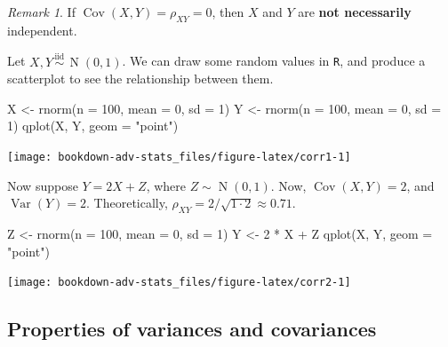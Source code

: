\documentclass[
]{book}
\newenvironment{Shaded}{\begin{snugshade}}{\end{snugshade}}
\newcommand{\AttributeTok}[1]{\textcolor[rgb]{0.77,0.63,0.00}{#1}}
\newcommand{\DecValTok}[1]{\textcolor[rgb]{0.00,0.00,0.81}{#1}}
\newcommand{\FunctionTok}[1]{\textcolor[rgb]{0.00,0.00,0.00}{#1}}
\newcommand{\NormalTok}[1]{#1}
\newcommand{\OtherTok}[1]{\textcolor[rgb]{0.56,0.35,0.01}{#1}}
\newcommand{\SpecialCharTok}[1]{\textcolor[rgb]{0.00,0.00,0.00}{#1}}
\newcommand{\StringTok}[1]{\textcolor[rgb]{0.31,0.60,0.02}{#1}}
\DeclareMathOperator{\Var}{Var}
\DeclareMathOperator{\Cov}{Cov}
\DeclareMathOperator{\N}{N}
\newcommand{\iid}{\,\overset{\text{iid}}{\sim}\,}
\theoremstyle{definition}
\theoremstyle{definition}
\theoremstyle{definition}
\theoremstyle{definition}
\theoremstyle{remark}
\newtheorem*{remark}{Remark}
\begin{document}
\begin{remark}
If \(\Cov(X,Y)=\rho_{XY}=0\), then \(X\) and \(Y\) are \textbf{not necessarily} independent.
\end{remark}

Let \(X,Y\iid\N(0,1)\).
We can draw some random values in \texttt{R}, and produce a scatterplot to see the relationship between them.

\begin{Shaded}
\begin{Highlighting}[]
\NormalTok{X }\OtherTok{\textless{}{-}} \FunctionTok{rnorm}\NormalTok{(}\AttributeTok{n =} \DecValTok{100}\NormalTok{, }\AttributeTok{mean =} \DecValTok{0}\NormalTok{, }\AttributeTok{sd =} \DecValTok{1}\NormalTok{)}
\NormalTok{Y }\OtherTok{\textless{}{-}} \FunctionTok{rnorm}\NormalTok{(}\AttributeTok{n =} \DecValTok{100}\NormalTok{, }\AttributeTok{mean =} \DecValTok{0}\NormalTok{, }\AttributeTok{sd =} \DecValTok{1}\NormalTok{)}
\FunctionTok{qplot}\NormalTok{(X, Y, }\AttributeTok{geom =} \StringTok{"point"}\NormalTok{)}
\end{Highlighting}
\end{Shaded}

\begin{center}\texttt{[image: bookdown-adv-stats\_files/figure-latex/corr1-1]} \end{center}

Now suppose \(Y=2X + Z\), where \(Z\sim\N(0,1)\).
Now, \(\Cov(X,Y)= 2\), and \(\Var(Y)=2\).
Theoretically, \(\rho_{XY}=2/\sqrt{1\cdot 2}\approx 0.71\).

\begin{Shaded}
\begin{Highlighting}[]
\NormalTok{Z }\OtherTok{\textless{}{-}} \FunctionTok{rnorm}\NormalTok{(}\AttributeTok{n =} \DecValTok{100}\NormalTok{, }\AttributeTok{mean =} \DecValTok{0}\NormalTok{, }\AttributeTok{sd =} \DecValTok{1}\NormalTok{)}
\NormalTok{Y }\OtherTok{\textless{}{-}} \DecValTok{2} \SpecialCharTok{*}\NormalTok{ X }\SpecialCharTok{+}\NormalTok{ Z}
\FunctionTok{qplot}\NormalTok{(X, Y, }\AttributeTok{geom =} \StringTok{"point"}\NormalTok{)}
\end{Highlighting}
\end{Shaded}

\begin{center}\texttt{[image: bookdown-adv-stats\_files/figure-latex/corr2-1]} \end{center}

\hypertarget{properties-of-variances-and-covariances}{%
\subsection{Properties of variances and covariances}\label{properties-of-variances-and-covariances}}
\end{document}
